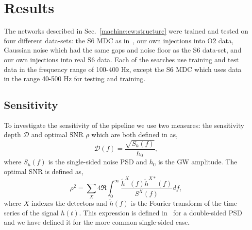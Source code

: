 \begin{description}
	 
	
\end{description}





\section{\label{machine:results}Results}

%
The networks described in Sec.~\ref{machine:cw:structure} were trained and tested on four different data-sets: the S6 \gls{MDC} as in~\cite{bayley2019SOAPGeneralised,walsh2016ComparisonMethods}, our own
injections into O2 data, Gaussian noise which had the same gaps and noise
floor as the S6 data-set, and our own injections into real S6 data. Each of
the searches use training and test data in the frequency range of 100-400 Hz,
except the S6 \gls{MDC} which uses data in the range 40-500 Hz for testing and
training. 


\subsection{\label{machine:results:sensitivity} Sensitivity}


%
To investigate the sensitivity of the pipeline we use two measures: the
sensitivity depth $\mathcal{D}$ \cite{prix2007SearchContinuous} and optimal
\gls{SNR} $\rho$ \cite{behnke2015PostprocessingMethods} which are both defined
in \cite{bayley2019SOAPGeneralised} as,
%
\begin{equation}
\label{machine:results:depth}
\mathcal{D}(f) = \frac{\sqrt{S_h(f)}}{h_0},
\end{equation}
%
where $S_h(f)$ is the single-sided noise \gls{PSD} and $h_0$ is the \gls{GW}
amplitude. The optimal \gls{SNR} is defined as,
%
\begin{equation}
\rho^2 = \sum_X 4
\Re\int^{\infty}_{0}\frac{\tilde{h}^X(f)\tilde{h}^{X*}(f)}{S^X(f)}df,
\end{equation}
%
where $X$ indexes the detectors and $\tilde{h}(f)$ is the Fourier transform of
the time series of the signal $h(t)$. This expression is defined
in~\cite{prix2007SearchContinuous} for a double-sided \gls{PSD} and we have
defined it for the more common single-sided case.


